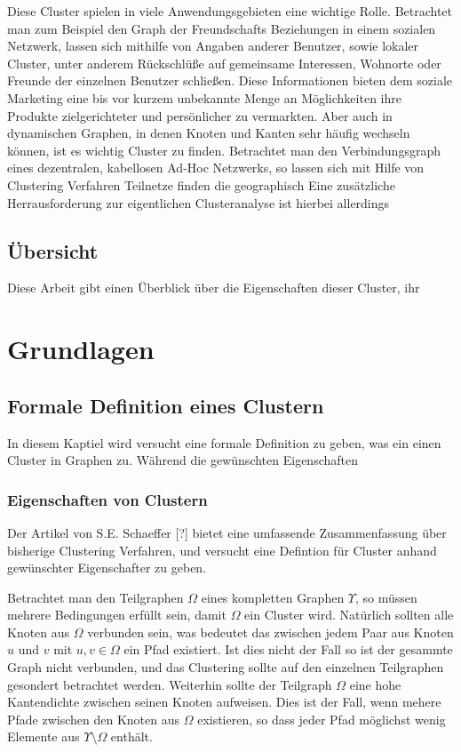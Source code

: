 \documentclass[journal]{vgtc}
\begin{document}
  Diese Cluster spielen in viele Anwendungsgebieten eine wichtige Rolle. 
  Betrachtet man zum Beispiel den Graph der Freundschafts Beziehungen in einem sozialen Netzwerk,
  lassen sich mithilfe von Angaben anderer Benutzer, sowie lokaler Cluster, unter anderem Rückschlüße 
  auf gemeinsame Interessen, Wohnorte oder Freunde der einzelnen Benutzer schließen.
  Diese Informationen bieten dem soziale Marketing eine bis vor kurzem unbekannte Menge
  an Möglichkeiten ihre Produkte zielgerichteter und persönlicher zu vermarkten.
  Aber auch in dynamischen Graphen, in denen Knoten und Kanten sehr häufig wechseln können,
  ist es wichtig Cluster zu finden. Betrachtet man den Verbindungsgraph eines dezentralen, 
  kabellosen Ad-Hoc Netzwerks, so lassen sich mit Hilfe von Clustering Verfahren 
  Teilnetze finden die geographisch
  Eine zusätzliche Herrausforderung zur eigentlichen Clusteranalyse ist hierbei allerdings
  
  \subsection*{Übersicht}
  Diese Arbeit gibt einen Überblick über die Eigenschaften dieser Cluster, ihr

\section{Grundlagen}
  
  \subsection{Formale Definition eines Clustern}
  In diesem Kaptiel wird versucht eine formale Definition zu geben, was ein einen Cluster in Graphen zu. 
  Während die gewünschten Eigenschaften
  
  \subsubsection{Eigenschaften von Clustern}
  \label{sec:properties} 
  Der Artikel von S.E. Schaeffer [?] bietet eine umfassende Zusammenfassung
  über bisherige Clustering Verfahren, und versucht eine Defintion für 
  Cluster anhand gewünschter Eigenschafter zu geben.
  
  Betrachtet man den Teilgraphen $\Omega$ eines kompletten Graphen $\Upsilon$, so müssen
  mehrere Bedingungen erfüllt sein, damit $\Omega$ ein Cluster wird.
  Natürlich sollten alle Knoten aus $\Omega$ verbunden sein, was bedeutet das 
  zwischen jedem Paar aus Knoten $u$ und $v$ mit $u,v \in \Omega$ ein Pfad existiert. 
  Ist dies nicht der Fall so ist der gesammte Graph nicht verbunden, und das 
  Clustering sollte auf den einzelnen Teilgraphen gesondert betrachtet werden.
  Weiterhin sollte der Teilgraph $\Omega$ eine hohe Kantendichte zwischen seinen Knoten
  aufweisen. Dies ist der Fall, wenn mehere Pfade zwischen den Knoten aus $\Omega$ existieren,
  so dass jeder Pfad möglichst wenig Elemente aus $\Upsilon \setminus \Omega$ enthält.
  
\end{document}

